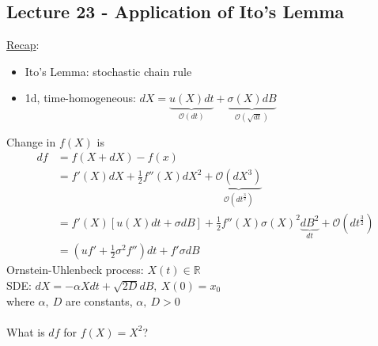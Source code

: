 \documentclass[12pt, letterpaper]{article}
\begin{document}
\subsection{Lecture 23 - Application of Ito's Lemma}
\underline{Recap}:
\begin{itemize}
    \item Ito's Lemma: stochastic chain rule
    \item 1d, time-homogeneous: $dX = \underbrace{u(X)dt}_{\mathcal{O}(dt)} + \underbrace{\sigma(X)dB}_{\mathcal{O}(\sqrt{dt})}$
\end{itemize} 
Change in $f(X)$ is 
    \begin{align*}
        df &= f(X + dX) - f(x) \\
        &= f'(X)dX + \frac 12 f''(X)dX^2 + \underbrace{\mathcal{O}(dX^3)}_{\mathcal{O}(dt^{\frac{3}{2}})} \\
        &= f'(X)[u(X)dt + \sigma dB] +\frac 12 f''(X)\sigma(X)^2\underbrace{dB^2}_{dt} + \mathcal{O}(dt^{\frac{3}{2}}) \\
        &= (uf' + \frac 12 \sigma^2 f'')dt + f'\sigma dB
    \end{align*}
 Ornstein-Uhlenbeck process: $X(t)\in \mathbb{R}$ \\
SDE: $dX = -\alpha Xdt + \sqrt{2D}dB,\ X(0) = x_0$ \\
where $\alpha,\ D$ are constants, $\alpha,\ D > 0$ \\ \\
What is $df$ for $f(X) = X^2$?
\end{document}
